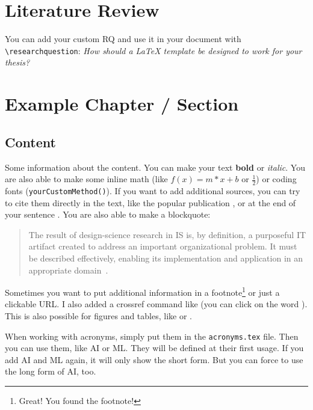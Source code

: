 \documentclass[
	12pt,
	a4paper,
	american,
	oneside
	]{scrartcl}
\newcommand\researchquestion{How should a LaTeX template be designed to work for your thesis?}
\begin{document}
	
	\clearpage
	\FloatBarrier
	\section{Literature Review}\label{sec:literatureReview}
	
	You can add your custom \ac{RQ} and use it in your document with \texttt{\textbackslash researchquestion}: \emph{\researchquestion}
	
	
	\clearpage
	\FloatBarrier
	\section{Example Chapter / Section}\label{sec:anotherSection}
	
	\subsection{Content}
	Some information about the content. You can make your text \textbf{bold} or \emph{italic}. You are also able to make some inline math (like $f(x)=m*x+b$ or $\frac{1}{2}$) or coding fonts (\texttt{yourCustomMethod()}). If you want to add additional sources, you can try to cite them directly in the text, like the popular publication \citet{hawking.1973}, or at the end of your sentence \citep[p.~1]{hawking.1973}. You are also able to make a blockquote:
	\blockquote{\grqq The result of design-science research in \acs{IS} is, by definition, a purposeful IT artifact created to address an important organizational problem. It must be described effectively, enabling its implementation and application in an appropriate domain\grqq\ \citep[p.~82]{hevner.2004}.}
	
	Sometimes you want to put additional information in a footnote\footnote{Great! You found the footnote!} or just a clickable URL. I also added a crossref command like  (you can click on the word \grqq {}\grqq). This is also possible for figures and tables, like  or .
	
	
	When working with acronyms, simply put them in the \texttt{acronyms.tex} file. Then you can use them, like \ac{AI} or \ac{ML}. They will be defined at their first usage. If you add \ac{AI} and \ac{ML} again, it will only show the short form. But you can force to use the long form of \acl{AI}, too.
	
\end{document}

